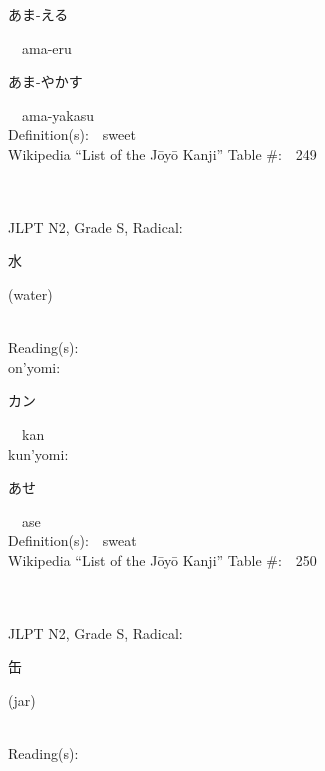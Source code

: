 \begin{multicols}{2}
{\hspace*{2em}}{\begin{CJK}{UTF8}{min} あま-える \end{CJK}}\ \ ama-eru\ \ \\
{\hspace*{2em}}{\begin{CJK}{UTF8}{min} あま-やかす \end{CJK}}\ \ ama-yakasu\ \ \\
Definition(s):\ \ sweet \\
Wikipedia ``List of the J\=oy\=o Kanji'' Table \#:\ \ 249 \\
\ \ \\
{\fontsize{34pt}{40pt}  }\ \ \\  %
{JLPT N2, Grade S, Radical:\ \ {\begin{CJK}{UTF8}{min} 水 \end{CJK}} (water) } \\
Reading(s):\ \ \\
{\hspace*{1em}}on'yomi:\ \ \\
{\hspace*{2em}}{\begin{CJK}{UTF8}{min} カン \end{CJK}}\ \ kan\ \ \\
{\hspace*{1em}}kun'yomi:\ \ \\
{\hspace*{2em}}{\begin{CJK}{UTF8}{min} あせ \end{CJK}}\ \ ase\ \ \\
Definition(s):\ \ sweat \\
Wikipedia ``List of the J\=oy\=o Kanji'' Table \#:\ \ 250 \\
\ \ \\
{\fontsize{34pt}{40pt}  }\ \ \\  %
{JLPT N2, Grade S, Radical:\ \ {\begin{CJK}{UTF8}{min} 缶 \end{CJK}} (jar) } \\
Reading(s):\ \ \\

\end{multicols}
